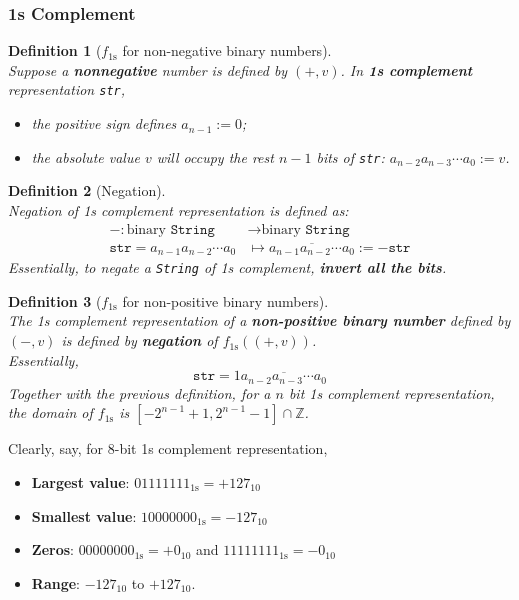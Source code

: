 \documentclass[12pt]{article}
\newtheorem{definition}{Definition}[section]
\theoremstyle{definition}
\begin{document}
\subsubsection{1s Complement}
\begin{definition}[$f_\text{1s}$ for non-negative binary numbers]
\hfill\\\normalfont
Suppose a \textbf{nonnegative} number is defined by $(+,v)$. In \textbf{1s complement} representation \texttt{str}, 
\begin{itemize}
\item the positive sign defines $a_{n-1}:=0$;
\item the absolute value $v$ will occupy the rest $n-1$ bits of \texttt{str}: $a_{n-2}a_{n-3}\cdots a_0:=v$.
\end{itemize}
\end{definition}
\begin{definition}[Negation]
\hfill\\\normalfont Negation of 1s complement representation is defined as:
\begin{align*}
-:\text{binary }\texttt{String}&\to \text{binary }\texttt{String}\\
\texttt{str}=a_{n-1}a_{n-2}\cdots a_0&\mapsto \overline{a_{n-1}a_{n-2}\cdots a_0}:=-\texttt{str}
\end{align*}
Essentially, to negate a \texttt{String} of 1s complement, \textbf{invert all the bits}.
\end{definition}
\begin{definition}[$f_\text{1s}$ for non-positive binary numbers]
\hfill\\\normalfont
The 1s complement representation of a \textbf{non-positive binary number} defined by $(-,v)$ is defined by \textbf{negation} of $f_\text{1s}((+,v))$.\\
Essentially,
\[
\texttt{str}=1\overline{a_{n-2}a_{n-3}\cdots a_0}
\]
Together with the previous definition, for a $n$ bit 1s complement representation, the domain of $f_\text{1s}$ is $[-2^{n-1}+1,2^{n-1}-1]\cap\mathbb{Z}$.
\end{definition}
Clearly, say, for 8-bit 1s complement representation,
\begin{itemize}
  \item \textbf{Largest value}: $01111111_{\text{1s}} = +127_{10}$
  \item \textbf{Smallest value}: $10000000_{\text{1s}}=-127_{10}$
  \item \textbf{Zeros}: $00000000_\text{1s}=+0_{10}$ and $11111111_\text{1s} = -0_{10}$
  \item \textbf{Range}: $-127_{10}$ to $+127_{10}$.
\end{itemize}
\end{document}
